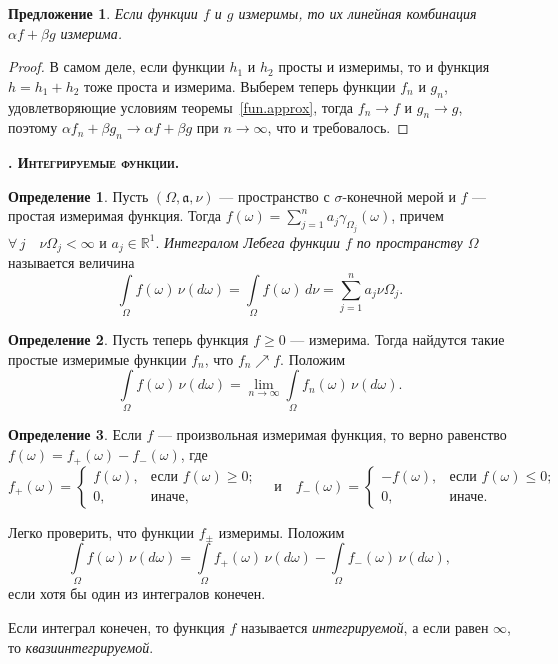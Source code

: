 \documentclass[12pt,titlepage]{article}
\newcounter{tema}
\renewcommand{\thetema}{\arabic{tema}}
\newcommand*{\tema}[1]{\vspace{10pt}
\begin{center}{\textbf{\refstepcounter{tema}
\textsc{\thetema. #1.}}}\vspace{7pt}
\end{center}}
\newtheorem{predl}{Предложение}[tema]
\theoremstyle{definition}
\newtheorem{defen}{Определение}[tema]
\begin{document}
\begin{predl}
Если функции $f$ и $g$ измеримы, то их линейная комбинация $\alpha
f+\beta g$ измерима.
\end{predl}

\begin{proof}
В самом деле, если функции $h_1$ и $h_2$ просты и измеримы, то и
функция $h=h_1+h_2$ тоже проста и измерима. Выберем теперь функции
$f_n$ и $g_n$, удовлетворяющие условиям теоремы~\ref{fun.approx},
тогда $f_n\to f$ и $g_n\to g$, поэтому $\alpha f_n+\beta g_n\to
\alpha f+\beta g$ при $n\to\infty$, что и требовалось.
\end{proof}

\tema{Интегрируемые функции}




\begin{defen}
Пусть $(\Omega,\mathfrak{a},\nu)$ --- пространство с
$\sigma$-конечной мерой и $f$ --- простая измеримая функция. Тогда
$f(\omega)=\sum\limits_{j=1}^n a_j\gamma_{\Omega_j}(\omega)$, причем
$\forall\, j\quad \nu\Omega_j<\infty$ и $a_j\in\mathbb{R}^1$.
\emph{Интегралом Лебега функции $f$ по пространству $\Omega$}
называется величина $$\int\limits_\Omega
\!f(\omega)\,\nu(d\omega)=\int\limits_\Omega
\!f(\omega)\,d\nu=\sum\limits_{j=1}^na_j\nu\Omega_j.$$
\end{defen}

\begin{defen}
Пусть теперь функция $f\geqslant 0$ --- измерима. Тогда найдутся
такие простые измеримые функции $f_n$, что $f_n\nearrow f$. Положим
$$\int\limits_\Omega\! f(\omega)\,\nu(d\omega)=\lim\limits_{n\to\infty}
\int\limits_\Omega f_n(\omega)\,\nu(d\omega).$$
\end{defen}

\begin{defen}
Если $f$ --- произвольная измеримая функция, то верно равенство
$f(\omega)=f_+(\omega)-f_-(\omega)$, где
$$f_+(\omega)=\begin{cases}f(\omega),&\text{если $f(\omega)\geqslant 0$};\\
0,& \text{иначе},\end{cases}\quad\text{и}\quad
f_-(\omega)=\begin{cases}-f(\omega),&\text{если $f(\omega)\leqslant 0$};\\
0,& \text{иначе}.\end{cases}$$

Легко проверить, что функции $f_\pm$ измеримы. Положим
$$\int\limits_\Omega \! f(\omega)\,\nu(d\omega)=\int\limits_\Omega \!
f_+(\omega)\,\nu(d\omega)-\int\limits_\Omega \!
f_-(\omega)\,\nu(d\omega),$$ если хотя бы один из интегралов
конечен.

Если интеграл конечен, то функция $f$ называется
\emph{интегрируемой}, а если равен $\infty$, то
\emph{квазиинтегрируемой}.
\end{defen}
\end{document}
